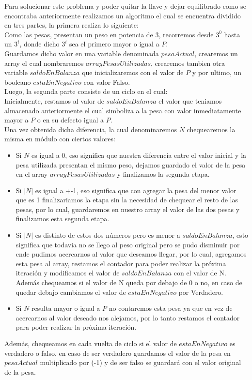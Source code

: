
Para solucionar este problema y poder quitar la llave y dejar equilibrado como se encontraba anteriormente realizamos un algoritmo el cual se encuentra dividido en tres partes, la primera realiza lo siguiente:\\

Como las pesas, presentan un peso en potencia de 3, recorremos desde $3^0$ hasta un $3^i$, donde dicho $3^i$ sea el primero mayor o igual a $P$.\\
Guardamos dicho valor en una variable denominada $pesaActual$, crearemos un array el cual nombraremos $arrayPesasUtilizadas$, crearemos tambien otra variable $saldoEnBalanza$ que inicializaremos con el valor de $P$ y por ultimo, un booleano $estaEnNegativo$ con valor Falso.\\


Luego, la segunda parte consiste de un ciclo en el cual:\\

	Inicialmente, restamos al valor de $saldoEnBalanza$ el valor que teniamos almacenado anteriormente el cual simboliza a la pesa con valor inmediatamente mayor a $P$ o en su defecto igual a $P$.\\
	Una vez obtenida dicha diferencia, la cual denominaremos $N$ chequearemos la misma en m\'odulo con ciertos valores:
	\begin{itemize}
	\item Si $N$ es igual a 0, eso significa que nuestra diferencia entre el valor inicial y la pesa utilizada presentan el mismo peso, dejamos guardado el valor de la pesa en el array $arrayPesasUtilizadas$ y finalizamos la segunda etapa.
	\item Si $|N|$ es igual a +-1, eso significa que con agregar la pesa del menor valor que es 1 finalizariamos la etapa sin la necesidad de chequear el resto de las pesas, por lo cual, guardaremos en nuestro array el valor de las dos pesas y finalizamos esta segunda etapa.
	\item Si $|N|$ es distinto de estos dos n\'umeros pero es menor a $saldoEnBalanza$, esto significa que todavia no se llego al peso original pero se pudo disminuir por ende pudimos acercarnos al valor que deseamos llegar, por lo cual, agregamos esta pesa al array, restamos el contador para poder realizar la pr\'oxima iteraci\'on y modificamos el valor de $saldoEnBalanza$ con el valor de N. Adem\'as chequeamos si el valor de N queda por debajo de 0 o no, en caso de quedar debajo cambiamos el valor de $estaEnNegativo$ por Verdadero.
	\item Si $N$ resulta mayor o igual a $P$ no contaremos esta pesa ya que en vez de acercarnos al valor deseado nos alejamos, por lo tanto restamos el contador para poder realizar la pr\'oxima iteraci\'on.
	\end{itemize}
	Adem\'as, chequeamos en cada vuelta de ciclo si el valor de $estaEnNegativo$ es verdadero o falso, en caso de ser verdadero guardamos el valor de la pesa en $pesaActual$ multiplicado por (-1) y de ser falso se guardar\'a con el valor original de la pesa.

